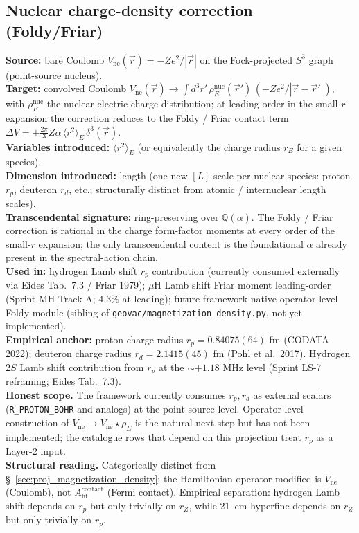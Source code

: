 \documentclass[11pt]{article}
\begin{document}
\subsection{Nuclear charge-density correction (Foldy/Friar)}
\label{sec:proj_charge_density}
\textbf{Source:} bare Coulomb $V_\text{ne}(\vec{r}) = -Z e^2 / |\vec{r}|$
on the Fock-projected $S^3$ graph (point-source nucleus).\\
\textbf{Target:} convolved Coulomb $V_\text{ne}(\vec{r}) \to \int
d^3r' \, \rho_E^\text{nuc}(\vec{r}')\,(-Ze^2/|\vec{r}-\vec{r}'|)$,
with $\rho_E^\text{nuc}$ the nuclear electric charge distribution; at
leading order in the small-$r$ expansion the correction reduces to
the Foldy / Friar contact term
$\Delta V = +\tfrac{2\pi}{3} Z\alpha\,\langle r^2\rangle_E\,\delta^3(\vec{r})$.\\
\textbf{Variables introduced:} $\langle r^2\rangle_E$ (or
equivalently the charge radius $r_E$ for a given species).\\
\textbf{Dimension introduced:} length (one new $[L]$ scale per
nuclear species: proton $r_p$, deuteron $r_d$, etc.; structurally
distinct from atomic / internuclear length scales).\\
\textbf{Transcendental signature:} ring-preserving over
$\mathbb{Q}(\alpha)$.  The Foldy / Friar correction is rational in
the charge form-factor moments at every order of the small-$r$
expansion; the only transcendental content is the foundational
$\alpha$ already present in the spectral-action chain.\\
\textbf{Used in:} hydrogen Lamb shift $r_p$ contribution (currently
consumed externally via Eides Tab.~7.3 / Friar 1979); $\mu$H Lamb
shift Friar moment leading-order (Sprint MH Track A; $4.3\%$ at
leading); future framework-native operator-level Foldy module
(sibling of \texttt{geovac/magnetization\_density.py}, not yet
implemented).\\
\textbf{Empirical anchor:} proton charge radius
$r_p = 0.84075(64)$ fm (CODATA 2022); deuteron charge radius
$r_d = 2.1415(45)$ fm (Pohl et al.~2017).  Hydrogen 2$S$ Lamb shift
contribution from $r_p$ at the $\sim +1.18$ MHz level (Sprint LS-7
reframing; Eides Tab.~7.3).\\
\textbf{Honest scope.}  The framework currently consumes $r_p, r_d$
as external scalars (\texttt{R\_PROTON\_BOHR} and analogs) at the
point-source level.  Operator-level construction of $V_\text{ne}
\to V_\text{ne} \star \rho_E$ is the natural next step but has not
been implemented; the catalogue rows that depend on this projection
treat $r_p$ as a Layer-2 input.\\
\textbf{Structural reading.}  Categorically distinct from
\S~\ref{sec:proj_magnetization_density}: the Hamiltonian operator
modified is $V_\text{ne}$ (Coulomb), not $A_\text{hf}^\text{contact}$
(Fermi contact).  Empirical separation: hydrogen Lamb shift depends
on $r_p$ but only trivially on $r_Z$, while 21~cm hyperfine depends
on $r_Z$ but only trivially on $r_p$.
\end{document}
